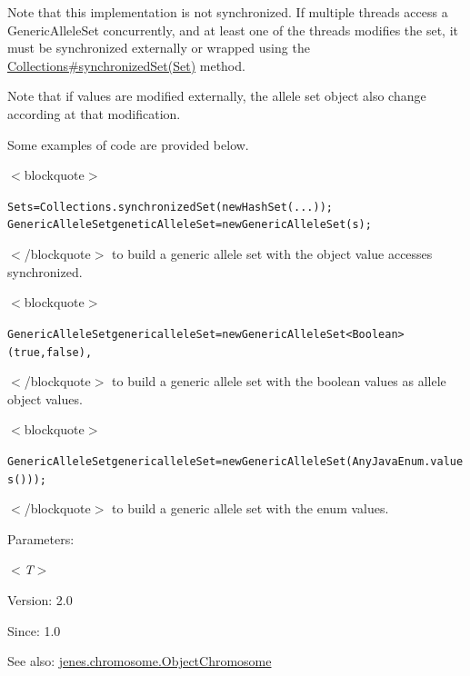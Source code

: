 Note that this implementation is not synchronized. If multiple threads access a GenericAlleleSet concurrently, and at least one of the threads modifies the set, it must be synchronized externally or wrapped using the \hyperlink{}{Collections\#synchronizedSet(Set)} method. 

Note that if values are modified externally, the allele set object also change according at that modification. 

Some examples of code are provided below. 

$<$blockquote$>$\small\begin{alltt}
    Set s = Collections.synchronizedSet(new HashSet(...));
    GenericAlleleSet geneticAlleleSet = new GenericAlleleSet(s);
 \end{alltt}
\normalsize 
$<$/blockquote$>$ to build a generic allele set with the object value accesses synchronized. 

$<$blockquote$>$\small\begin{alltt}
    GenericAlleleSet generic alleleSet = new GenericAlleleSet<Boolean>(true, false),
 \end{alltt}
\normalsize 
$<$/blockquote$>$ to build a generic allele set with the boolean values as allele object values. 

$<$blockquote$>$\small\begin{alltt}
    GenericAlleleSet generic alleleSet = new GenericAlleleSet(AnyJavaEnum.values()) );
 \end{alltt}
\normalsize 
$<$/blockquote$>$ to build a generic allele set with the enum values. 

\begin{Desc}
\item[Parameters:]
\begin{description}
\item[{\em $<$T$>$}]\end{description}
\end{Desc}
\begin{Desc}
\item[Version:]2.0 \end{Desc}
\begin{Desc}
\item[Since:]1.0\end{Desc}
\begin{Desc}
\item[See also:]\hyperlink{classjenes_1_1chromosome_1_1_object_chromosome}{jenes.chromosome.ObjectChromosome} \end{Desc}


